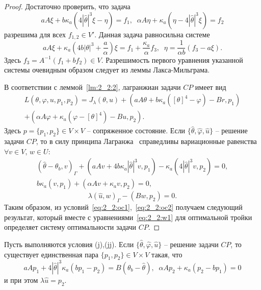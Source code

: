 \begin{proof}
    Достаточно проверить, что задача
    \[
        aA \xi + b \kappa_a (4|\hat{\theta}|^3 \xi - \eta) = f_1, \; \;
        \alpha A \eta + \kappa_a (\eta - 4|\hat{\theta}|^3 \xi) = f_2
    \]
    разрешима для всех $f_{1,2}\in V'$.
    Данная задача равносильна системе
    \[
        aA\xi + \kappa_a\left(4b|\theta|^3 + \frac{a}{\alpha}\right) \xi = f_1
        +\frac{\kappa_a}{\alpha}f_3, \; \;
        \eta =\frac{1}{\alpha b}( f_3-a\xi).
    \]
    Здесь $f_3=A^{-1}(f_1+bf_2)\in V$. Разрешимость первого уравнения указанной
    системы очевидным образом следует из леммы Лакса-Мильграма.


    В соответствии с леммой~\ref{lm:2_2:2}, лагранжиан задачи $CP$ имеет вид
    \begin{gather*}
        L(\theta, \varphi, u, p_1, p_2) = J_\lambda(\theta, u)
        + (aA\theta + b\kappa_a([\theta]^4 - \varphi) - Br, p_1) \\
        + (\alpha A \varphi + \kappa_a(\varphi - [\theta]^4) - Bu, p_2).
    \end{gather*}
    Здесь $p=\{p_1,p_2\}\in V\times V$ -- сопряженное состояние.
    Если $\{\hat{\theta}, \hat{\varphi}, \hat{u} \}$ -- решение задачи $CP$, то
    в силу принципа Лагранжа~\cite[Гл. 2, теорема 1.5]{10} справедливы вариационные равенства
    $\forall v\in V,\, w\in U$:
    \begin{equation}
        \label{eq:2_2:oc1}
        \begin{gathered}
        (\hat{\theta} -\theta_b, v)
            _\Gamma + (aAv + 4 b\kappa_a |\hat{\theta}|^3 v, p_1)
            - \kappa_a ( 4 |\hat{\theta}|^3 v, p_2) = 0,\\
            b \kappa_a (v, p_1)+ (\alpha A v + \kappa_a v, p_2) = 0,
        \end{gathered}
    \end{equation}
    \begin{equation}
        \label{eq:2_2:oc2}
        \lambda(\hat{u},w)_\Gamma - (Bw, p_2) = 0.
    \end{equation}
    Таким образом, из условий~\eqref{eq:2_2:oc1},~\eqref{eq:2_2:oc2}
    получаем следующий результат, который вместе с уравнениями~\eqref{eq:2_2:w1}
    для оптимальной тройки определяет систему оптимальности задачи $CP$.
\end{proof}

\begin{theorem}
    \label{th:2_2:2}
    Пусть выполняются условия (j),(jj).
    Если $\{\hat{\theta}, \hat{\varphi}, \hat{u}\}$ -- решение задачи $CP$,
    то существует единственная пара $\{p_1, p_2 \} \in V\times V$ такая, что
    \begin{equation}
        \label{eq:2_2:as}
        aAp_1 +4|\hat{\theta}|^3 \kappa_a(bp_1 - p_2) = B(\theta_b - \hat{\theta}), \;\;
        \alpha A p_2 + \kappa_a (p_2 - b p_1)=0
    \end{equation}
    и при этом $\lambda\hat{u} = p_2$.
\end{theorem}


